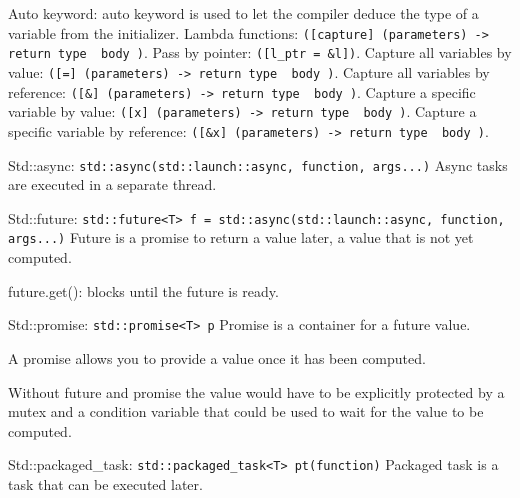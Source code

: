 \documentclass{article}
\begin{document}
Auto keyword: auto keyword is used to let the compiler deduce the type of a variable from the initializer.
Lambda functions: \texttt{([capture] (parameters) -> return type { body })}.
Pass by pointer: \texttt{([l\_ptr = \&l])}.
Capture all variables by value: \texttt{([=] (parameters) -> return type { body })}.
Capture all variables by reference: \texttt{([\&] (parameters) -> return type { body })}.
Capture a specific variable by value: \texttt{([x] (parameters) -> return type { body })}.
Capture a specific variable by reference: \texttt{([\&x] (parameters) -> return type { body })}. 

Std::async: \texttt{std::async(std::launch::async, function, args...)}
Async tasks are executed in a separate thread.

Std::future: \texttt{std::future<T> f = std::async(std::launch::async, function, args...)}
Future is a promise to return a value later, a value that is not yet computed.

future.get(): blocks until the future is ready.

Std::promise: \texttt{std::promise<T> p}
Promise is a container for a future value.

A promise allows you to provide a value once it has been computed.

Without future and promise the value would have to be explicitly protected by a 
mutex and a condition variable that could be used to wait for the value to be computed.

Std::packaged\_task: \texttt{std::packaged\_task<T> pt(function)}
Packaged task is a task that can be executed later.
\end{document}
